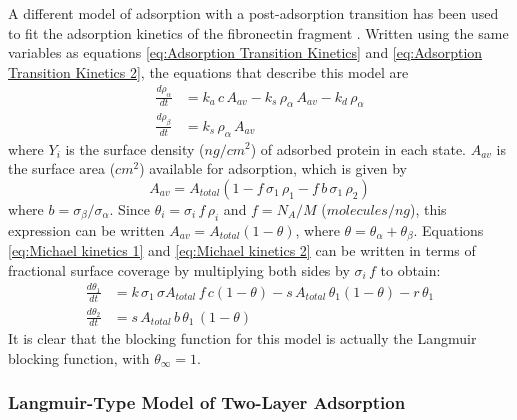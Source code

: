 A different model of adsorption with a post-adsorption transition
has been used to fit the adsorption kinetics of the fibronectin fragment
 \cite{Lundstroem1984,Michael2003}. Written
using the same variables as equations \ref{eq:Adsorption Transition Kinetics}
and \ref{eq:Adsorption Transition Kinetics 2}, the equations that
describe this model are\begin{align}
\frac{d\rho_{\alpha}}{dt} & =k_{a}\, c\, A_{av}-k_{s}\,\rho_{\alpha}\, A_{av}-k_{d}\,\rho_{\alpha}\label{eq:Michael kinetics 1}\\
\frac{d\rho_{\beta}}{dt} & =k_{s}\,\rho_{\alpha}\, A{}_{av}\label{eq:Michael kinetics 2}\end{align}
where $Y_{i}$ is the surface density ($ng/cm^{2}$) of adsorbed protein
in each state. $A_{av}$ is the surface area ($cm^{2}$) available
for adsorption, which is given by\[
A_{av}=A_{total}\left(1-f\,\sigma_{1}\,\rho_{1}-f\, b\,\sigma_{1}\,\rho_{2}\right)\]
where $b=\sigma_{\beta}/\sigma_{\alpha}$. Since $\theta_{i}=\sigma_{i}\, f\,\rho_{i}$
and $f=N_{A}/M$ ($molecules/ng$), this expression can be written
$A_{av}=A_{total}\left(1-\theta\right)$, where $\theta=\theta_{\alpha}+\theta_{\beta}$.
Equations \ref{eq:Michael kinetics 1} and \ref{eq:Michael kinetics 2}
can be written in terms of fractional surface coverage by multiplying
both sides by $\sigma_{i}\, f$ to obtain:\begin{align}
\frac{d\theta_{1}}{dt} & =k\,\sigma_{1}\,\sigma A_{total}\, f\, c\left(1-\theta\right)-s\, A_{total}\,\theta{}_{1}\left(1-\theta\right)-r\,\theta_{1}\label{eq:Langmuir two stage 1}\\
\frac{d\theta_{2}}{dt} & =s\, A_{total}\, b\,\theta_{1}\,\left(1-\theta\right)\label{eq:Langmuir two stage 2}\end{align}
It is clear that the blocking function for this model is actually
the Langmuir blocking function, with $\theta_{\infty}=1$.


\subsubsection{Langmuir-Type Model of Two-Layer Adsorption}

